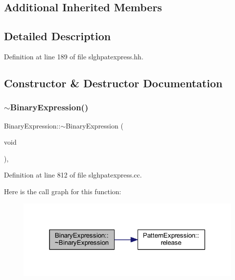\subsection*{Additional Inherited Members}


\subsection{Detailed Description}


Definition at line 189 of file slghpatexpress.\+hh.



\subsection{Constructor \& Destructor Documentation}
\mbox{\label{class_binary_expression_a4a94945aac08d6ad45a1fbe9d0a42cb5}} 
\subsubsection{\texorpdfstring{$\sim$BinaryExpression()}{~BinaryExpression()}}
{\footnotesize\ttfamily Binary\+Expression\+::$\sim$\+Binary\+Expression (\begin{DoxyParamCaption}\item[{void}]{ }\end{DoxyParamCaption})\hspace{0.3cm}{\ttfamily [protected]}, {\ttfamily [virtual]}}



Definition at line 812 of file slghpatexpress.\+cc.

Here is the call graph for this function\+:
\nopagebreak
\begin{figure}[H]
\begin{center}
\leavevmode
\includegraphics[width=318pt]{class_binary_expression_a4a94945aac08d6ad45a1fbe9d0a42cb5_cgraph}
\end{center}
\end{figure}
\mbox{\label{class_binary_expression_a4e926e2b391cc51c985e5a57de85fbca}} 
